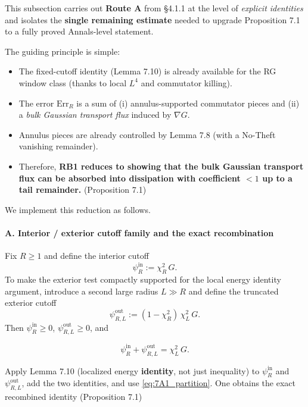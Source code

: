 \documentclass[
  11pt,
]{article}
\providecommand{\tightlist}{%
  \setlength{\itemsep}{0pt}\setlength{\parskip}{0pt}}
\begin{document}
This subsection carries out \textbf{Route A} from §4.1.1 at the level of \emph{explicit identities} and isolates the \textbf{single remaining estimate} needed to upgrade Proposition 7.1 to a fully proved Annals-level statement.

The guiding principle is simple:

\begin{itemize}
\tightlist
\item
  The fixed-cutoff identity (Lemma 7.10) is already available for the RG window class (thanks to local \(L^4\) and commutator killing).
\item
  The error \(\mathrm{Err}_R\) is a sum of (i) annulus-supported commutator pieces and (ii) a \emph{bulk Gaussian transport flux} induced by \(\nabla G\).
\item
  Annulus pieces are already controlled by Lemma 7.8 (with a No-Theft vanishing remainder).
\item
  Therefore, \textbf{RB1 reduces to showing that the bulk Gaussian transport flux can be absorbed into dissipation with coefficient \(<1\) up to a tail remainder.} (Proposition 7.1)
\end{itemize}

We implement this reduction as follows.

\hypertarget{a.-interior-exterior-cutoff-family-and-the-exact-recombination}{%
\paragraph{A. Interior / exterior cutoff family and the exact recombination}\label{a.-interior-exterior-cutoff-family-and-the-exact-recombination}}

Fix \(R\ge 1\) and define the interior cutoff \[
\psi_R^{\mathrm{in}}:=\chi_R^2\,G.
\] To make the exterior test compactly supported for the local energy identity argument, introduce a second large radius \(L\gg R\) and define the truncated exterior cutoff \[
\psi_{R,L}^{\mathrm{out}}
:=
(1-\chi_R^2)\,\chi_L^2\,G.
\] Then \(\psi_R^{\mathrm{in}}\ge 0\), \(\psi_{R,L}^{\mathrm{out}}\ge 0\), and

\begin{equation}
\psi_R^{\mathrm{in}}+\psi_{R,L}^{\mathrm{out}}=\chi_L^2\,G.
\tag{7.A1}\label{eq:7A1_partition}
\end{equation}

Apply Lemma 7.10 (localized energy \textbf{identity}, not just inequality) to \(\psi_R^{\mathrm{in}}\) and \(\psi_{R,L}^{\mathrm{out}}\), add the two identities, and use \eqref{eq:7A1_partition}. One obtains the exact recombined identity (Proposition 7.1)
\end{document}
